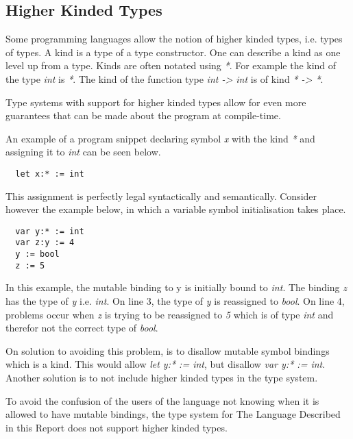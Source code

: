 \subsection{Higher Kinded Types}
\label{sub:higher_kinded_types}

Some programming languages allow the notion of higher kinded types, i.e. types of types. A kind is a type of a type constructor. One can describe a kind as one level up from a type. Kinds are often notated using \emph{*}. For example the kind of the type \emph{int} is \emph{*}. The kind of the function type \emph{int -> int} is of kind \emph{* -> *}.

Type systems with support for higher kinded types allow for even more guarantees that can be made about the program at compile-time.

An example of a program snippet declaring symbol \emph{x} with the kind \emph{*} and assigning it to \emph{int} can be seen below.

\begin{verbatim}
  let x:* := int
\end{verbatim}

This assignment is perfectly legal syntactically and semantically. Consider however the example below, in which a variable symbol initialisation takes place.

\begin{verbatim}
  var y:* := int
  var z:y := 4
  y := bool
  z := 5
\end{verbatim}

In this example, the mutable binding to y is initially bound to \emph{int}. The binding \emph{z} has the type of \emph{y} i.e. \emph{int}. On line 3, the type of \emph{y} is reassigned to \emph{bool}. On line 4, problems occur when \emph{z} is trying to be reassigned to \emph{5} which is of type \emph{int} and therefor not the correct type of \emph{bool}.

On solution to avoiding this problem, is to disallow mutable symbol bindings which is a kind. This would allow \emph{let y:* := int}, but disallow \emph{var y:* := int}. Another solution is to not include higher kinded types in the type system.

To avoid the confusion of the users of the language not knowing when it is allowed to have mutable bindings, the type system for The Language Described in this Report does not support higher kinded types.


